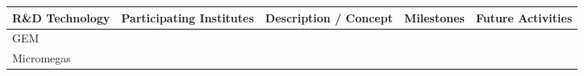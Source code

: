\begin{landscape}
\begin{table}[h]
    \centering
    \begin{adjustbox}{max width=1\textwidth}
\begin{tabularx}{2\textwidth}{lXXXX}
    \toprule
    R\&D Technology & Participating Institutes & Description / Concept & Milestones & Future Activities \\
    \midrule
        GEM &
        &
        &
        & \\
    \midrule
    Micromegas &
    &
    &
    & \\
    \bottomrule
\end{tabularx}
\end{adjustbox}

\end{table}
\end{landscape}
\restoregeometry
